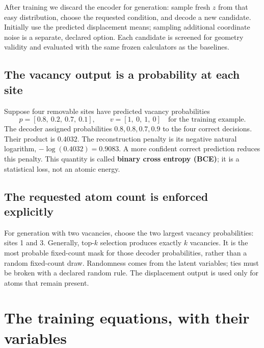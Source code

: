 After training we discard the encoder for generation: sample fresh $z$ from that easy distribution, choose the requested condition, and decode a new candidate. Initially use the predicted displacement means; sampling additional coordinate noise is a separate, declared option. Each candidate is screened for geometry validity and evaluated with the same frozen calculators as the baselines.

\subsection*{The vacancy output is a probability at each site}
Suppose four removable sites have predicted vacancy probabilities
\[
 p=[0.8,\ 0.2,\ 0.7,\ 0.1],\qquad
 v=[1,\ 0,\ 1,\ 0]\quad\text{for the training example}.
\]
The decoder assigned probabilities $0.8,0.8,0.7,0.9$ to the four correct decisions. Their product is $0.4032$. The reconstruction penalty is its negative natural logarithm, $-\log(0.4032)=0.9083$. A more confident correct prediction reduces this penalty. This quantity is called \textbf{binary cross entropy (BCE)}; it is a statistical loss, not an atomic energy.

\subsection*{The requested atom count is enforced explicitly}
For generation with two vacancies, choose the two largest vacancy probabilities: sites 1 and 3. Generally, top-$k$ selection produces exactly $k$ vacancies. It is the most probable fixed-count mask for those decoder probabilities, rather than a random fixed-count draw. Randomness comes from the latent variables; ties must be broken with a declared random rule. The displacement output is used only for atoms that remain present.


\clearpage
\section{The training equations, with their variables}\label{sec:loss}

